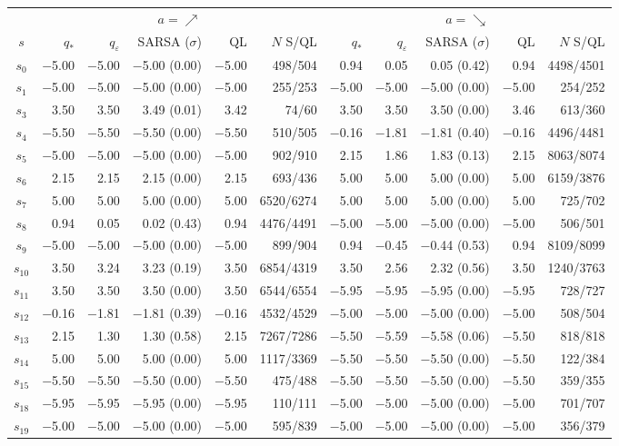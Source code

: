 \begin{tabular}{c rrrrr rrrrr}
\toprule
 & \multicolumn{5}{c}{$a=\nearrow$} & \multicolumn{5}{c}{$a=\searrow$} \\
\cmidrule(lr){2-6}\cmidrule(lr){7-11}
$s$ & $q_*$ & $q_\varepsilon$ & SARSA ($\sigma$) & QL & $N$ S/QL & $q_*$ & $q_\varepsilon$ & SARSA ($\sigma$) & QL & $N$ S/QL \\
\midrule
$s_{0}$ & $-$5.00 & $-$5.00 & $-$5.00 (0.00) & $-$5.00 & 498/504 & 0.94 & 0.05 & 0.05 (0.42) & 0.94 & 4498/4501 \\
$s_{1}$ & $-$5.00 & $-$5.00 & $-$5.00 (0.00) & $-$5.00 & 255/253 & $-$5.00 & $-$5.00 & $-$5.00 (0.00) & $-$5.00 & 254/252 \\
$s_{3}$ & 3.50 & 3.50 & 3.49 (0.01) & 3.42 & 74/60 & 3.50 & 3.50 & 3.50 (0.00) & 3.46 & 613/360 \\
$s_{4}$ & $-$5.50 & $-$5.50 & $-$5.50 (0.00) & $-$5.50 & 510/505 & $-$0.16 & $-$1.81 & $-$1.81 (0.40) & $-$0.16 & 4496/4481 \\
$s_{5}$ & $-$5.00 & $-$5.00 & $-$5.00 (0.00) & $-$5.00 & 902/910 & 2.15 & 1.86 & 1.83 (0.13) & 2.15 & 8063/8074 \\
$s_{6}$ & 2.15 & 2.15 & 2.15 (0.00) & 2.15 & 693/436 & 5.00 & 5.00 & 5.00 (0.00) & 5.00 & 6159/3876 \\
$s_{7}$ & 5.00 & 5.00 & 5.00 (0.00) & 5.00 & 6520/6274 & 5.00 & 5.00 & 5.00 (0.00) & 5.00 & 725/702 \\
$s_{8}$ & 0.94 & 0.05 & 0.02 (0.43) & 0.94 & 4476/4491 & $-$5.00 & $-$5.00 & $-$5.00 (0.00) & $-$5.00 & 506/501 \\
$s_{9}$ & $-$5.00 & $-$5.00 & $-$5.00 (0.00) & $-$5.00 & 899/904 & 0.94 & $-$0.45 & $-$0.44 (0.53) & 0.94 & 8109/8099 \\
$s_{10}$ & 3.50 & 3.24 & 3.23 (0.19) & 3.50 & 6854/4319 & 3.50 & 2.56 & 2.32 (0.56) & 3.50 & 1240/3763 \\
$s_{11}$ & 3.50 & 3.50 & 3.50 (0.00) & 3.50 & 6544/6554 & $-$5.95 & $-$5.95 & $-$5.95 (0.00) & $-$5.95 & 728/727 \\
$s_{12}$ & $-$0.16 & $-$1.81 & $-$1.81 (0.39) & $-$0.16 & 4532/4529 & $-$5.00 & $-$5.00 & $-$5.00 (0.00) & $-$5.00 & 508/504 \\
$s_{13}$ & 2.15 & 1.30 & 1.30 (0.58) & 2.15 & 7267/7286 & $-$5.50 & $-$5.59 & $-$5.58 (0.06) & $-$5.50 & 818/818 \\
$s_{14}$ & 5.00 & 5.00 & 5.00 (0.00) & 5.00 & 1117/3369 & $-$5.50 & $-$5.50 & $-$5.50 (0.00) & $-$5.50 & 122/384 \\
$s_{15}$ & $-$5.50 & $-$5.50 & $-$5.50 (0.00) & $-$5.50 & 475/488 & $-$5.50 & $-$5.50 & $-$5.50 (0.00) & $-$5.50 & 359/355 \\
$s_{18}$ & $-$5.95 & $-$5.95 & $-$5.95 (0.00) & $-$5.95 & 110/111 & $-$5.00 & $-$5.00 & $-$5.00 (0.00) & $-$5.00 & 701/707 \\
$s_{19}$ & $-$5.00 & $-$5.00 & $-$5.00 (0.00) & $-$5.00 & 595/839 & $-$5.00 & $-$5.00 & $-$5.00 (0.00) & $-$5.00 & 356/379 \\
\bottomrule
\end{tabular}
